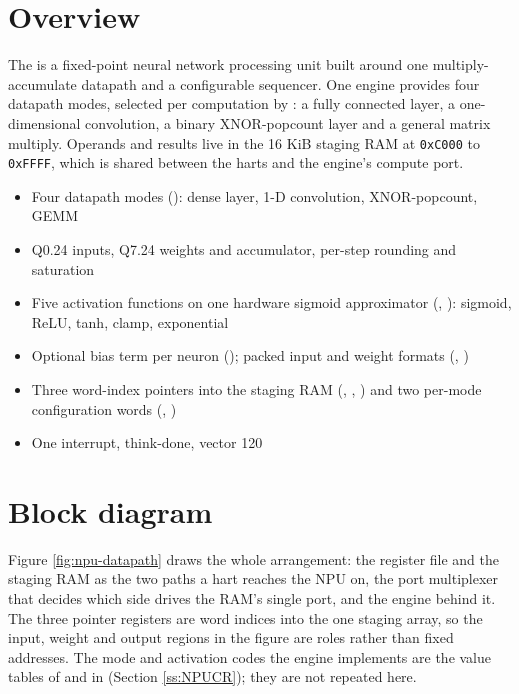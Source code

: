 \section{Overview}

The  is a fixed-point neural network processing unit built around one multiply-accumulate datapath and a configurable sequencer. One engine provides four datapath modes, selected per computation by : a fully connected layer, a one-dimensional convolution, a binary XNOR-popcount layer and a general matrix multiply. Operands and results live in the 16 KiB staging RAM at \texttt{0xC000} to \texttt{0xFFFF}, which is shared between the harts and the engine's compute port.

\begin{itemize}
	\item Four datapath modes (): dense layer, 1-D convolution, XNOR-popcount, GEMM
	\item Q0.24 inputs, Q7.24 weights and accumulator, per-step rounding and saturation
	\item Five activation functions on one hardware sigmoid approximator (, ): sigmoid, ReLU, tanh, clamp, exponential
	\item Optional bias term per neuron (); packed input and weight formats (, )
	\item Three word-index pointers into the staging RAM (, , ) and two per-mode configuration words (, )
	\item One interrupt, think-done, vector 120
\end{itemize}

\section{Block diagram}

Figure \ref{fig:npu-datapath} draws the whole arrangement: the register file and the staging RAM as the two paths a hart reaches the NPU on, the port multiplexer that decides which side drives the RAM's single port, and the engine behind it. The three pointer registers are word indices into the one staging array, so the input, weight and output regions in the figure are roles rather than fixed addresses. The mode and activation codes the engine implements are the value tables of  and  in  (Section \ref{ss:NPUCR}); they are not repeated here.

